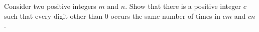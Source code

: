 Consider two positive integers $m$ and $n$. Show that there is a positive integer $c$ such that
every digit other than $0$ occurs the same number of times in $cm$ and $cn$.